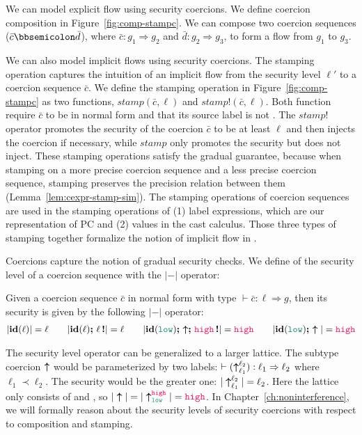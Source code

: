 We can model explicit flow using security coercions. We define coercion
composition in Figure~\ref{fig:comp-stampc}. We can compose two coercion
sequences ($\bar{c} \mdoubleplus \bar{d}$), where $\bar{c} : g_1 \Rightarrow
g_2$ and $\bar{d} : g_2 \Rightarrow g_3$, to form a flow from $g_1$ to $g_3$.

We can also model implicit flows using security coercions. The stamping
operation captures the intuition of an implicit flow from the security level
$\ell'$ to a coercion sequence $\bar{c}$. We define the stamping operation in
Figure~\ref{fig:comp-stampc} as two functions, $\mathit{stamp}(\bar{c},\ell)$
and $\mathit{stamp!}(\bar{c},\ell)$. Both function require $\bar{c}$ to be in
normal form and that its source label is not \unk. The $\mathit{stamp!}$
operator promotes the security of the coercion $\bar{c}$ to be at least $\ell$
and then injects the coercion if necessary, while $\mathit{stamp}$ only promotes
the security but does not inject. These stamping operations satisfy the gradual
guarantee, because when stamping on a more precise coercion sequence and a less
precise coercion sequence, stamping preserves the precision relation between
them (Lemma~\ref{lem:cexpr-stamp-sim}). The stamping operations of coercion
sequences are used in the stamping operations of (1) label expressions, which
are our representation of PC and (2) values in the cast calculus. Those three
types of stamping together formalize the notion of implicit flow in \Surface.

Coercions capture the notion of gradual security checks. We define of the
security level of a coercion sequence with the $|{-}|$ operator:

\begin{definition}
  \label{def:sec}
  Given a coercion sequence $\bar{c}$ in normal form with type
  $\vdash \bar{c} : \ell \Rightarrow g$,
  then its security is given by the following $|{-}|$ operator:
  {\small
    \begin{gather*}
      | \id{\ell} | = \ell \qquad
      | \id{\ell} \seq \inj{\ell} | = \ell \qquad
      | \id{\low} \seq \up \seq \inj{\high} | = \high \qquad
      | \id{\low} \seq \up | = \high
    \end{gather*}
  }
\end{definition}

\noindent The security level operator can be generalized to a larger lattice.
The subtype coercion $\boldsymbol{\uparrow}$ would be parameterized by two labels: $\vdash
(\boldsymbol{\uparrow}_{\ell_1}^{\ell_2}) : \ell_1 \Rightarrow \ell_2$ where $\ell_1 \prec
\ell_2$. The security would be the greater one: $|\boldsymbol{\uparrow}_{\ell_1}^{\ell_2}| =
\ell_2$. Here the lattice only consists of \low and \high, so $|\up| =
|\up_{\low}^{\high}| = \high$. In Chapter~\ref{ch:noninterference}, we will
formally reason about the security levels of security coercions with respect to
composition and stamping.


